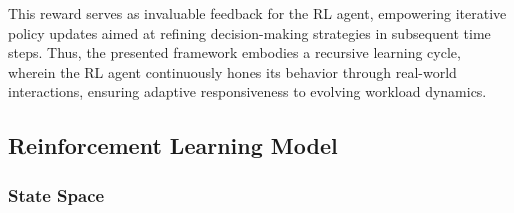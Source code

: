 This reward serves as invaluable feedback for the RL agent, empowering iterative policy updates aimed at refining decision-making strategies in subsequent time steps. Thus, the presented framework embodies a recursive learning cycle, wherein the RL agent continuously hones its behavior through real-world interactions, ensuring adaptive responsiveness to evolving workload dynamics.

\subsection{Reinforcement Learning Model}

\subsubsection{State Space}

